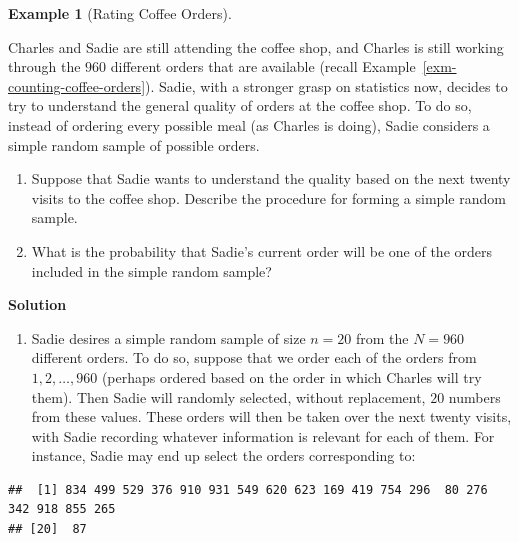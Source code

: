 \documentclass[
  letterpaper,
  DIV=11,
  numbers=noendperiod]{scrreprt}
\providecommand{\tightlist}{%
  \setlength{\itemsep}{0pt}\setlength{\parskip}{0pt}}\usepackage{longtable,booktabs,array}
\theoremstyle{definition}
\theoremstyle{definition}
\newtheorem{example}{Example}[chapter]
\theoremstyle{definition}
\theoremstyle{remark}
\begin{document}
\begin{example}[Rating Coffee
Orders]\protect\hypertarget{exm-sadie-samples-drinks}{}\label{exm-sadie-samples-drinks}

Charles and Sadie are still attending the coffee shop, and Charles is
still working through the \(960\) different orders that are available
(recall Example~\ref{exm-counting-coffee-orders}). Sadie, with a
stronger grasp on statistics now, decides to try to understand the
general quality of orders at the coffee shop. To do so, instead of
ordering every possible meal (as Charles is doing), Sadie considers a
simple random sample of possible orders.

\begin{enumerate}
\def\labelenumi{\alph{enumi}.}
\tightlist
\item
  Suppose that Sadie wants to understand the quality based on the next
  twenty visits to the coffee shop. Describe the procedure for forming a
  simple random sample.
\item
  What is the probability that Sadie's current order will be one of the
  orders included in the simple random sample?
\end{enumerate}

\begin{tcolorbox}[enhanced jigsaw, colback=white, colframe=quarto-callout-color-frame, arc=.35mm, leftrule=.75mm, rightrule=.15mm, opacityback=0, breakable, bottomrule=.15mm, left=2mm, toprule=.15mm]

\vspace{-3mm}\textbf{Solution}\vspace{3mm}

\begin{enumerate}
\def\labelenumi{\alph{enumi}.}
\tightlist
\item
  Sadie desires a simple random sample of size \(n=20\) from the
  \(N=960\) different orders. To do so, suppose that we order each of
  the orders from \(1,2,\dots,960\) (perhaps ordered based on the order
  in which Charles will try them). Then Sadie will randomly selected,
  without replacement, \(20\) numbers from these values. These orders
  will then be taken over the next twenty visits, with Sadie recording
  whatever information is relevant for each of them. For instance, Sadie
  may end up select the orders corresponding to:
\end{enumerate}

\begin{verbatim}
##  [1] 834 499 529 376 910 931 549 620 623 169 419 754 296  80 276 342 918 855 265
## [20]  87
\end{verbatim}


\end{tcolorbox}
\end{example}
\end{document}
